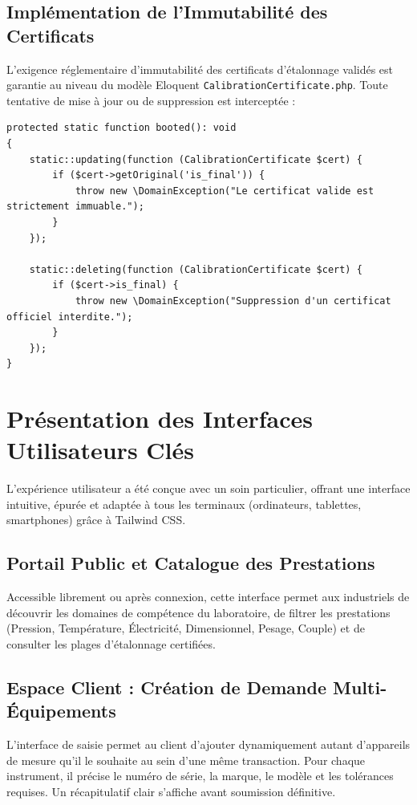 \documentclass{bts-report}
\begin{document}
\subsection{Impl\'ementation de l'Immutabilit\'e des Certificats}
L'exigence r\'eglementaire d'immutabilit\'e des certificats d'\'etalonnage valid\'es est garantie au niveau du mod\`ele Eloquent \texttt{CalibrationCertificate.php}. Toute tentative de mise \`a jour ou de suppression est intercept\'ee :
\begin{verbatim}
protected static function booted(): void
{
    static::updating(function (CalibrationCertificate $cert) {
        if ($cert->getOriginal('is_final')) {
            throw new \DomainException("Le certificat valide est strictement immuable.");
        }
    });

    static::deleting(function (CalibrationCertificate $cert) {
        if ($cert->is_final) {
            throw new \DomainException("Suppression d'un certificat officiel interdite.");
        }
    });
}
\end{verbatim}

\section{Pr\'esentation des Interfaces Utilisateurs Cl\'es}
L'exp\'erience utilisateur a \'et\'e con\c{c}ue avec un soin particulier, offrant une interface intuitive, \'epur\'ee et adapt\'ee \`a tous les terminaux (ordinateurs, tablettes, smartphones) gr\^ace \`a Tailwind CSS.

\subsection{Portail Public et Catalogue des Prestations}
Accessible librement ou apr\`es connexion, cette interface permet aux industriels de d\'ecouvrir les domaines de comp\'etence du laboratoire, de filtrer les prestations (Pression, Temp\'erature, \'Electricit\'e, Dimensionnel, Pesage, Couple) et de consulter les plages d'\'etalonnage certifi\'ees.

\subsection{Espace Client : Cr\'eation de Demande Multi-\'Equipements}
L'interface de saisie permet au client d'ajouter dynamiquement autant d'appareils de mesure qu'il le souhaite au sein d'une m\^eme transaction. Pour chaque instrument, il pr\'ecise le num\'ero de s\'erie, la marque, le mod\`ele et les tol\'erances requises. Un r\'ecapitulatif clair s'affiche avant soumission d\'efinitive.
\end{document}
